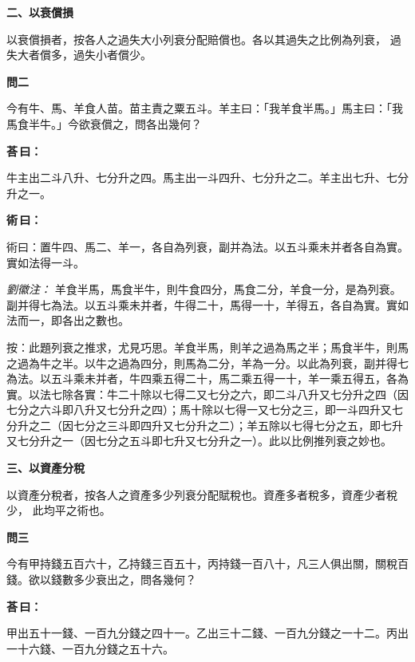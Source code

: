 \documentclass[11pt,a4paper]{article}
\newenvironment{problem}[1][]{%
  \par\vspace{0.6em}\noindent\textcolor{problemcolor}{\textbf{問\ignorespaces#1\unskip}\hspace{0.5em}}%
  \ignorespaces
}{\par\vspace{0.4em}}
\newenvironment{answer}{%
  \par\noindent\textcolor{answercolor}{\textbf{荅\,曰：}}%
  \ignorespaces
}{\par\vspace{0.3em}}
\newenvironment{method}{%
  \par\noindent\textcolor{methodcolor}{\textbf{術\,曰：}}%
  \ignorespaces
}{\par\vspace{0.4em}}
\newenvironment{liuhuicomm}{%
  \par\vspace{0.3em}\noindent\textcolor{commentarycolor}{\small\textit{劉徽注：}}}%
  {\par\vspace{0.5em}}
\begin{document}
\vspace{0.8em}
\noindent\textbf{\large 二、以衰償損}
\vspace{0.5em}

\noindent 以衰償損者，按各人之過失大小列衰分配賠償也。各以其過失之比例為列衰，
過失大者償多，過失小者償少。

\begin{problem}[二]
今有牛、馬、羊食人苗。苗主責之粟五斗。羊主曰：「我羊食半馬。」馬主曰：「我馬食半牛。」今欲衰償之，問各出幾何？
\end{problem}

\begin{answer}
牛主出二斗八升、七分升之四。馬主出一斗四升、七分升之二。羊主出七升、七分升之一。
\end{answer}

\begin{method}
術曰：置牛四、馬二、羊一，各自為列衰，副并為法。以五斗乘未并者各自為實。實如法得一斗。
\end{method}

\begin{liuhuicomm}
羊食半馬，馬食半牛，則牛食四分，馬食二分，羊食一分，是為列衰。副并得七為法。以五斗乘未并者，牛得二十，馬得一十，羊得五，各自為實。實如法而一，即各出之數也。

按：此題列衰之推求，尤見巧思。羊食半馬，則羊之過為馬之半；馬食半牛，則馬之過為牛之半。以牛之過為四分，則馬為二分，羊為一分。以此為列衰，副并得七為法。以五斗乘未并者，牛四乘五得二十，馬二乘五得一十，羊一乘五得五，各為實。以法七除各實：牛二十除以七得二又七分之六，即二斗八升又七分升之四（因七分之六斗即八升又七分升之四）；馬十除以七得一又七分之三，即一斗四升又七分升之二（因七分之三斗即四升又七分升之二）；羊五除以七得七分之五，即七升又七分升之一（因七分之五斗即七升又七分升之一）。此以比例推列衰之妙也。
\end{liuhuicomm}

\vspace{0.8em}
\noindent\textbf{\large 三、以資產分稅}
\vspace{0.5em}

\noindent 以資產分稅者，按各人之資產多少列衰分配賦稅也。資產多者稅多，資產少者稅少，
此均平之術也。

\begin{problem}[三]
今有甲持錢五百六十，乙持錢三百五十，丙持錢一百八十，凡三人俱出關，關稅百錢。欲以錢數多少衰出之，問各幾何？
\end{problem}

\begin{answer}
甲出五十一錢、一百九分錢之四十一。乙出三十二錢、一百九分錢之一十二。丙出一十六錢、一百九分錢之五十六。
\end{answer}
\end{document}
